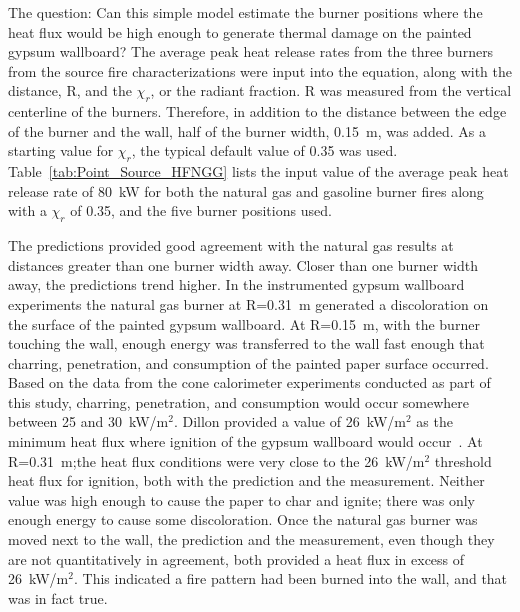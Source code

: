 \documentclass[twoside]{uocthesis}
\begin{document}
{The question: Can this simple model estimate the burner positions where the heat flux would be high enough to generate thermal damage on the painted gypsum wallboard?  The average peak heat release rates from the three burners from the source fire characterizations were input into the equation, along with the distance, R, and the $\chi_r$, or the radiant fraction.  R was measured from the vertical centerline of the burners.  Therefore, in addition to the distance between the edge of the burner and the wall, half of the burner width, 0.15~m, was added.  As a starting value for $\chi_r$, the typical default value of 0.35 was used.  Table~\ref{tab:Point_Source_HFNGG} lists the input value of the average peak heat release rate of 80~kW for both the natural gas and gasoline burner fires along with a $\chi_r$ of 0.35, and the five burner positions used.  

The predictions provided good agreement with the natural gas results at distances greater than one burner width away.  Closer than one burner width away, the predictions trend higher.  In the instrumented gypsum wallboard experiments the natural gas burner at R=0.31~m generated a discoloration on the surface of the painted gypsum wallboard.  At R=0.15~m, with the burner touching the wall, enough energy was transferred to the wall fast enough that charring, penetration, and consumption of the painted paper surface occurred.  Based on the data from the cone calorimeter experiments conducted as part of this study, charring, penetration, and consumption would occur somewhere between 25 and 30~kW/m$^2$.  Dillon provided a value of 26~kW/m$^2$ as the minimum heat flux where ignition of the gypsum wallboard would occur~\cite{Dillon:1998}.  At R=0.31~m;the heat flux conditions were very close to the 26~kW/m$^2$ threshold heat flux for ignition, both with the prediction and the measurement.  Neither value was high enough to cause the paper to char and ignite; there was only enough energy to cause some discoloration.  Once the natural gas burner was moved next to the wall, the prediction and the measurement, even though they are not quantitatively in agreement, both provided a heat flux in excess of 26~kW/m$^2$.  This indicated a fire pattern had been burned into the wall, and that was in fact true.  

}
\end{document}
